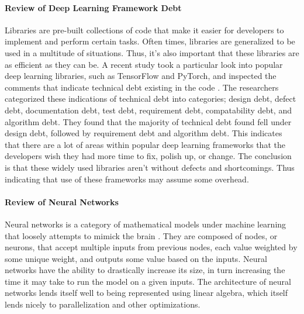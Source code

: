 \documentclass[12pt]{article}
\begin{document}
\paragraph{Review of Deep Learning Framework Debt}

Libraries are pre-built collections of code that make it easier for developers to implement and perform certain tasks.
Often times, libraries are generalized to be used in a multitude of situations.
Thus, it's also important that these libraries are as efficient as they can be.
A recent study took a particular look into popular deep learning libraries, such as TensorFlow and PyTorch, and inspected the comments that indicate technical debt existing in the code \cite{article_deep_learning_framework_debt}.
The researchers categorized these indications of technical debt into categories; design debt, defect debt, documentation debt, test debt, requirement debt, compatability debt, and algorithm debt.
They found that the majority of technical debt found fell under design debt, followed by requirement debt and algorithm debt.
This indicates that there are a lot of areas within popular deep learning frameworks that the developers wish they had more time to fix, polish up, or change.
The conclusion is that these widely used libraries aren't without defects and shortcomings.
Thus indicating that use of these frameworks may assume some overhead.


\paragraph{Review of Neural Networks}

Neural networks is a category of mathematical models under machine learning that loosely attempts to mimick the brain \cite{book_intro_neural_networks}.
They are composed of nodes, or neurons, that accept multiple inputs from previous nodes, each value weighted by some unique weight, and outputs some value based on the inputs.
Neural networks have the ability to drastically increase its size, in turn increasing the time it may take to run the model on a given inputs.
The architecture of neural networks lends itself well to being represented using linear algebra, which itself lends nicely to parallelization and other optimizations.

\end{document}

